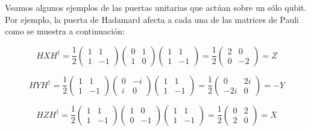 \documentclass[11pt,a4paper,twoside,pdf]{article}
\numberwithin{equation}{section}
\begin{document}
		Veamos algunos ejemplos de las puertas unitarias que actúan sobre un sólo qubit. Por ejemplo, la puerta de Hadamard afecta a cada una de las matrices de Pauli como se muestra a continuación:
		
			\begin{equation}\label{eq: HadamardX}
				HXH^{\dagger} = \frac{1}{2}  \left(\begin{array}{cc}1 & 1\\1 & -1\end{array}\right)
																 \left(\begin{array}{cc}0 & 1\\1 & 0\end{array}\right)
																 \left(\begin{array}{cc}1 & 1\\1 & -1\end{array}\right)
										   = \frac{1}{2}  \left(\begin{array}{cc}2 & 0\\0 & -2\end{array}\right) = Z					 
			\end{equation}
			
			\begin{equation}\label{eq: HadamardY}
				HYH^{\dagger} = \frac{1}{2}  \left(\begin{array}{cc}1 & 1\\1 & -1\end{array}\right)
																\left(\begin{array}{cc}0 & -i\\i & 0\end{array}\right)
																\left(\begin{array}{cc}1 & 1\\1 & -1\end{array}\right)
										  = \frac{1}{2}  \left(\begin{array}{cc}0 & 2i\\-2i & 0\end{array}\right) = -Y					 
			\end{equation}
		
			\begin{equation}\label{eq: HadamardZ}
				HZH^{\dagger} = \frac{1}{2} \left(\begin{array}{cc}1 & 1\\1 & -1\end{array}\right)
																\left(\begin{array}{cc}1 & 0\\0 & -1\end{array}\right)
																\left(\begin{array}{cc}1 & 1\\1 & -1\end{array}\right)
										   = \frac{1}{2} \left(\begin{array}{cc}0 & 2\\2 & 0\end{array}\right) = X					 
			\end{equation}
			
\end{document}
